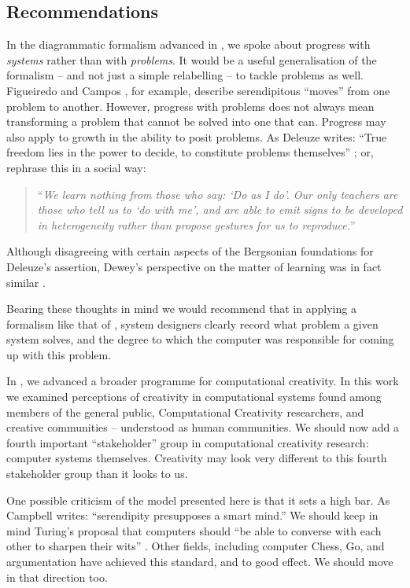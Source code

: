 \subsection{Recommendations} \label{sec:recommendations}

In the diagrammatic formalism advanced in
\cite{colton-assessingprogress}, we spoke about progress with
\emph{systems} rather than with \emph{problems}.  It would be a useful
generalisation of the formalism -- and not just a simple relabelling
-- to tackle problems as well.
%
Figueiredo and Campos \citeyear{Figueiredo2001}, for example, describe
serendipitous ``moves'' from one problem to another.
%
However, progress with problems does not always mean transforming a
problem that cannot be solved into one that can.  Progress may also
apply to growth in the ability to posit problems.  As Deleuze writes:
``True freedom lies in the power to decide, to constitute problems
themselves'' \cite[p. 15]{deleuze1991bergsonism}; or, rephrase this in
a social way:
\begin{quote}
``\emph{We learn nothing from those who say: `Do as I do'. Our only teachers
  are those who tell us to `do with me', and are able to emit signs to
  be developed in heterogeneity rather than propose gestures for us to
  reproduce.}''~\cite[p. 26]{deleuze1994difference}
\end{quote}
Although disagreeing with certain aspects of the Bergsonian
foundations for Deleuze's assertion, Dewey's perspective on the matter
of learning was in fact similar \cite[p. 73]{dewey-by-mead}.

Bearing these thoughts in mind we would recommend that in applying a
formalism like that of \cite{colton-assessingprogress}, system
designers clearly record what problem a given system solves, and the
degree to which the computer was responsible for coming up with this
problem.

In \cite{stakeholder-groups-bookchapter}, we advanced a broader
programme for computational creativity.  In this work we examined
perceptions of creativity in computational systems found among members
of the general public, Computational Creativity researchers, and
creative communities -- understood as human communities.  We should
now add a fourth important ``stakeholder'' group in computational
creativity research: computer systems themselves.  Creativity may look
very different to this fourth stakeholder group than it looks to us.

One possible criticism of the model presented here is that it sets a
high bar.  As Campbell \citeyear{campbell} writes: ``serendipity
presupposes a smart mind.''  We should keep in mind Turing's proposal
that computers should ``be able to converse with each other to sharpen
their wits'' \cite{turing-intelligent}.  Other fields, including
computer Chess, Go, and argumentation have achieved this standard, and
to good effect.  We should move in that direction too.

